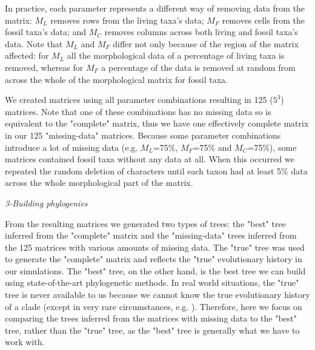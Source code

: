 \documentclass[12pt,letterpaper]{article}
\renewcommand{\subsection}[1]{%
\bigskip
\begin{center}
\begin{large}
\normalfont\itshape #1
\end{large}
\end{center}}
\begin{document}
In practice, each parameter represents a different way of removing data from the matrix: $M_{L}$ removes rows from the living taxa's data; $M_{F}$ removes cells from the fossil taxa's data; and $M_{C}$ removes columns across both living and fossil taxa's data. Note that $M_{L}$ and $M_{F}$ differ not only because of the region of the matrix affected: for $M_{L}$ all the morphological data of a percentage of living taxa is removed, whereas for $M_{F}$ a percentage of the data is removed at random from across the whole of the morphological matrix for fossil taxa.

We created matrices using all parameter combinations resulting in 125 ($5^3$) matrices. Note that one of these combinations has no missing data so is equivalent to the "complete" matrix, thus we have one effectively complete matrix in our 125 "missing-data" matrices. Because some parameter combinations introduce a lot of missing data (e.g. $M_L$=75\%, $M_F$=75\% and $M_C$=75\%), some matrices contained fossil taxa without any data at all. When this occurred we repeated the random deletion of characters until each taxon had at least 5\% data across the whole morphological part of the matrix.


\subsection{3-Building phylogenies}
From the resulting matrices we generated two types of trees: the "best" tree inferred from the "complete" matrix and the "missing-data" trees inferred from the 125 matrices with various amounts of missing data. The "true" tree was used to generate the "complete" matrix and reflects the "true" evolutionary history in our simulations. The "best" tree, on the other hand, is the best tree we can build using state-of-the-art phylogenetic methods. In real world situations, the "true" tree is never available to us because we cannot know the true evolutionary history of a clade (except in very rare circumstances, e.g. \citealt{rozen2005}). Therefore, here we focus on comparing the trees inferred from the matrices with missing data to the "best" tree, rather than the "true" tree, as the "best" tree is generally what we have to work with.
\end{document}
